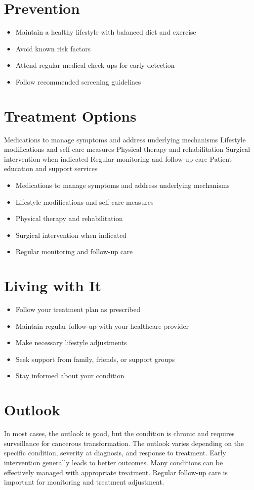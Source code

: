 \section{Prevention}
\begin{itemize}[noitemsep]
  \item Maintain a healthy lifestyle with balanced diet and exercise
  \item Avoid known risk factors
  \item Attend regular medical check-ups for early detection
  \item Follow recommended screening guidelines
\end{itemize}
\section{Treatment Options}
Medications to manage symptoms and address underlying mechanisms Lifestyle modifications and self-care measures Physical therapy and rehabilitation Surgical intervention when indicated Regular monitoring and follow-up care Patient education and support services

\begin{itemize}[noitemsep]
  \item Medications to manage symptoms and address underlying mechanisms
  \item Lifestyle modifications and self-care measures
  \item Physical therapy and rehabilitation
  \item Surgical intervention when indicated
  \item Regular monitoring and follow-up care
\end{itemize}
\section{Living with It}
\begin{itemize}[noitemsep]
  \item Follow your treatment plan as prescribed
  \item Maintain regular follow-up with your healthcare provider
  \item Make necessary lifestyle adjustments
  \item Seek support from family, friends, or support groups
  \item Stay informed about your condition
\end{itemize}
\section{Outlook}
In most cases, the outlook is good, but the condition is chronic and requires surveillance for cancerous transformation. The outlook varies depending on the specific condition, severity at diagnosis, and response to treatment. Early intervention generally leads to better outcomes. Many conditions can be effectively managed with appropriate treatment. Regular follow-up care is important for monitoring and treatment adjustment.
